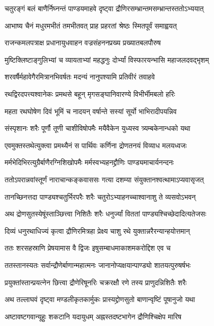 \twolineshloka
{चतुरङ्गं बलं बाणैर्निघ्नन्तं पाण्डयमाहवे}
{दृष्ट्वा द्रौणिरसम्भ्रान्तमसम्भ्रान्तस्ततोऽभ्ययात्}


\twolineshloka
{आभाष्य चैनं मधुरमभीतं तमभीतवत्}
{प्राह प्रहरतां श्रेष्ठः स्मितपूर्वं समाह्वयत्}


\twolineshloka
{राजन्कमलपत्राक्ष प्रधानायुधवाहन}
{वज्रसंहननप्रख्य प्रख्यातबलपौरुष}


\twolineshloka
{मुष्टिक्लिष्टाङ्गुलिभ्यां च व्यायताभ्यां महद्धनुः}
{दोर्भ्यां विस्फारयन्भासि महाजलदवद्भृशम्}


\twolineshloka
{शरवर्षैर्महावेगैरमित्रानभिवर्षतः}
{मदन्यं नानुपश्यामि प्रतिवीरं तवाहवे}


\twolineshloka
{रथद्विरदपत्त्यश्वानेकः प्रमथसे बहून्}
{मृगसङ्घानिवारण्ये विभीर्भीमबलो हरिः}


\twolineshloka
{महता रथघोषेण दिवं भूमिं च नादयन्}
{वर्षान्ते सस्यां सूर्यो भाभिरादीपयन्निव}


\twolineshloka
{संस्पृशानः शरैः पूर्णौ तूणी चाशीविषोपमैः}
{मयैवैकेन युध्यस्व त्र्यम्बकेनान्धको यथा}


\twolineshloka
{एवमुक्तस्तथेत्युक्त्वा प्रमथ्यैनं स पार्थिवः}
{कर्णिना द्रोणतनयं विव्याध मलयध्वजः}


\twolineshloka
{मर्मभेदिभिरत्युग्रैर्बाणैरग्निशिखोपमैः}
{मर्मस्वभ्यहनद्द्रौणिः पाण्ड्यमाचार्यनन्दनः}


\twolineshloka
{ततोऽपरान्नवांस्तूर्णं नाराचान्कङ्कवाससः}
{गत्या दशम्या संयुक्तानश्वत्थामाऽप्यवासृजत्}


\twolineshloka
{तानच्छिनत्तदा पाण्ड्यश्चतुर्भिरपरैः शरैः}
{चतुरोऽभ्याहनच्चाश्वानाशु ते व्यसवोऽभवन्}


\twolineshloka
{अथ द्रोणसुतस्येषूंस्ताञ्छित्त्वा निशितैः शरैः}
{धनुर्ज्यां विततां पाण्ड्यश्चिच्छेदादित्यतेजसः}


\twolineshloka
{दिव्यं धनुरथाधिज्यं कृत्वा द्रौणिरमित्रहा}
{प्रेक्ष्य चाशु रथे युक्तान्नरैरन्यान्हयोत्तमान्}


\twolineshloka
{ततः शरसहस्राणि प्रेषयामास वै द्विजः}
{इषुसम्बाधमाकाशमकरोद्दिश एव च}


\twolineshloka
{ततस्तानस्यतः सर्वान्द्रौणेर्बाणान्महात्मनः}
{जानानोप्यक्षयान्पाण्ड्यो शातयत्पुरुषर्षभः}


\twolineshloka
{प्रयुक्तांस्तान्प्रयत्नेन छित्त्वा द्रौणेरिषूनरिः}
{चक्ररक्षौ रणे तस्य प्राणुदन्निशितैः शरैः}


\twolineshloka
{अथ तल्लाघवं दृष्ट्वा मण्डलीकृतकार्मुकः}
{प्रास्यद्द्रोणसुतो बाणान्वृष्टिं पूषानुजो यथा}


\twolineshloka
{अष्टावष्टगवान्यूहुः शकटानि यदायुधम्}
{अह्नस्तदष्टभागेन द्रौणिश्चिक्षेप मारिष}


